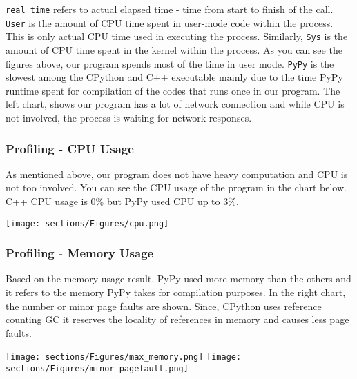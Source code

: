 \texttt{real time} refers to actual elapsed time - time from start to finish of the call. \texttt{User} is the amount of CPU time spent in user-mode code within the process. This is only actual CPU time used in executing the process. Similarly, \texttt{Sys} is the amount of CPU time spent in the kernel within the process. As you can see the figures above, our program spends most of the time in user mode. \texttt{PyPy} is the slowest among the CPython and C++ executable mainly due to the time PyPy runtime spent for compilation of the codes that runs once in our program. The left chart, shows our program has a lot of network connection and while CPU is not involved, the process is waiting for network responses.

\subsubsection{Profiling - CPU Usage}
As mentioned above, our program does not have heavy computation and CPU is not too involved. You can see the CPU usage of the program in the chart below. C++ CPU usage is 0\% but PyPy used CPU up to 3\%.

\begin{center}
\texttt{[image: sections/Figures/cpu.png]}
\end{center}

\subsubsection{Profiling - Memory Usage}
Based on the memory usage result, PyPy used more memory than the others and it refers to the memory PyPy takes for compilation purposes. In the right chart, the number or minor page faults are shown. Since, CPython uses reference counting GC it reserves the locality of references in memory and causes less page faults. 

\hspace*{-0.8in}
\texttt{[image: sections/Figures/max\_memory.png]}
\texttt{[image: sections/Figures/minor\_pagefault.png]}

